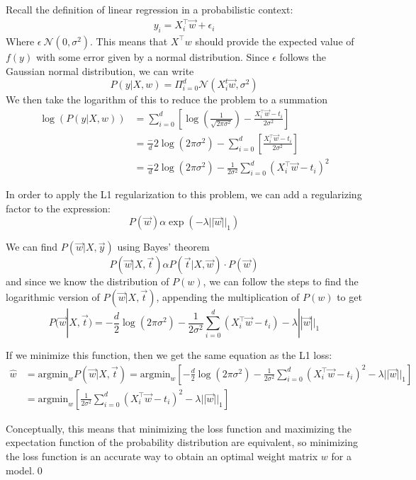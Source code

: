 Recall the definition of linear regression in a probabilistic context:
\begin{align*}
  y_{i}=X_{i}^{\top}\vec{w} + \epsilon_{i}
\end{align*}
Where $\epsilon ~ \mathcal{N}(0, \sigma^{2})$. This means that $X^{\top}w$ should provide the expected value of $f(y)$ with some error given by a normal distribution. Since $\epsilon$ follows the Gaussian normal distribution, we can write
\begin{equation*}
  P(y|X, w) = \Pi_{i=0}^{d} \mathcal{N}(X_{i}^{t}\vec{w},\sigma^{2})
\end{equation*}
We then take the logarithm of this to reduce the problem to a summation
\begin{align*}
  \log\left(P(y|X, w)\right) &= \sum_{i=0}^{d}\left[\log\left(\frac{1}{\sqrt{2\pi\sigma^{2}}}\right) - \frac{X_{i}^{\top}\vec{w} - t_{i}}{2\sigma^{2}}\right] \\
  &=\frac-{d}{2}\log\left(2\pi\sigma^{2}\right) - \sum_{i=0}^{d}\left[ \frac{X_{i}^{\top}\vec{w} - t_{i}}{2\sigma^{2}}\right] \\
  &=\frac-{d}{2}\log\left(2\pi\sigma^{2}\right) - \frac{1}{2\sigma^{2}}\sum_{i=0}^{d}\left(X_{i}^{\top}\vec{w} - t_{i}\right)^{2}
\end{align*}

In order to apply the L1 regularization to this problem, we can add a regularizing factor to the expression:
\begin{equation*}
  P(\vec{w})\alpha \exp\left(-\lambda ||\vec{w}||_{1}\right)
\end{equation*}

We can find $P(\vec{w} | X, \vec{y})$ using Bayes' theorem
\begin{equation*}
  P(\vec{w}|X, \vec{t}) \alpha P(\vec{t} | X,\vec{w})\cdot P(\vec{w})
\end{equation*}
and since we know the distribution of $P(w)$, we can follow the steps to find the logarithmic version of $P(\vec{w}|X,\vec{t})$, appending the multiplication of $P(w)$ to get
\begin{equation*}
  P(\vec{w}|X,\vec{t}) = -\frac{d}{2}\log\left(2\pi\sigma^{2}\right) - \frac{1}{2\sigma^{2}}\sum_{i=0}^{d}\left(X_{i}^{\top}\vec{w} - t_{i}\right) -\lambda ||\vec{w}||_{1}
\end{equation*}

If we minimize this function, then we get the same equation as the L1 loss:
\begin{align*}
  \hat{w} &= \text{argmin}_{w}
  P(\vec{w}|X,\vec{t}) = \text{argmin}_{w}\left[-\frac{d}{2}\log\left(2\pi\sigma^{2}\right) - \frac{1}{2\sigma^{2}}\sum_{i=0}^{d}\left(X_{i}^{\top}\vec{w} - t_{i}\right)^{2} -\lambda ||\vec{w}||_{1}\right] \\
        &=\text{argmin}_{w}\left[\frac{1}{2\sigma^{2}}\sum_{i=0}^{d}\left(X_{i}^{\top}\vec{w} - t_{i}\right)^{2} -\lambda ||\vec{w}||_{1}\right]
\end{align*}

Conceptually, this means that minimizing the loss function and maximizing the expectation function of the probability distribution are equivalent, so minimizing the loss function is an accurate way to obtain an optimal weight matrix $w$ for a model.\qed

